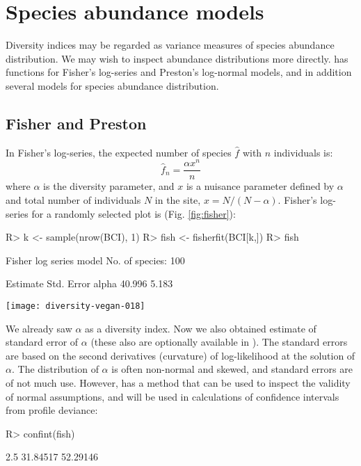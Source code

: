 \documentclass[article,nojss]{jss}
\begin{document}
\section{Species abundance models}

Diversity indices may be regarded as variance measures of species
abundance distribution.  We may wish to inspect abundance
distributions more directly.   has functions for
Fisher's log-series and Preston's log-normal models, and in addition
several models for species abundance distribution.

\subsection{Fisher and Preston}

In Fisher's log-series, the expected number of species $\hat f$ with $n$
individuals is:
\begin{equation}
\hat f_n = \frac{\alpha x^n}{n}
\end{equation}
where $\alpha$ is the diversity parameter, and $x$ is a nuisance
parameter defined by $\alpha$ and total number
of individuals $N$ in the site, $x = N/(N-\alpha)$.  Fisher's
log-series for a randomly selected plot is (Fig. \ref{fig:fisher}):
\begin{Schunk}
\begin{Sinput}
R> k <- sample(nrow(BCI), 1)
R> fish <- fisherfit(BCI[k,])
R> fish
\end{Sinput}
\begin{Soutput}
Fisher log series model
No. of species: 100 

      Estimate Std. Error
alpha   40.996      5.183
\end{Soutput}
\end{Schunk}
\begin{SCfigure}
\texttt{[image: diversity-vegan-018]}
\caption{Fisher's log-series fitted to one randomly selected site
  (20).}
\label{fig:fisher}
\end{SCfigure}
We already saw $\alpha$ as a diversity index.  Now we also obtained
estimate of standard error of $\alpha$ (these also are optionally
available in ).  The standard errors are based on
the second derivatives (curvature) of log-likelihood at the solution
of $\alpha$.  The distribution of $\alpha$ is often non-normal
and skewed, and standard errors are of not much use.  However,
 has a  method that can be used to
inspect the validity of normal assumptions, and will be used in
calculations of confidence intervals from profile deviance:
\begin{Schunk}
\begin{Sinput}
R> confint(fish)
\end{Sinput}
\begin{Soutput}
   2.5 %   97.5 % 
31.84517 52.29146 
\end{Soutput}
\end{Schunk}
\end{document}

